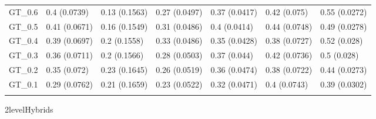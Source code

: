 \documentclass[12pt,titlepage]{article}
\begin{document}
\begin{table}[ht]
\begin{tabular}{rllllll}
  GT\_0.6 & 0.4 (0.0739) & 0.13 (0.1563) & 0.27 (0.0497) & 0.37 (0.0417) & 0.42 (0.075) & 0.55 (0.0272) \\ 
  GT\_0.5 & 0.41 (0.0671) & 0.16 (0.1549) & 0.31 (0.0486) & 0.4 (0.0414) & 0.44 (0.0748) & 0.49 (0.0278) \\ 
  GT\_0.4 & 0.39 (0.0697) & 0.2 (0.1558) & 0.33 (0.0486) & 0.35 (0.0428) & 0.38 (0.0727) & 0.52 (0.028) \\ 
  GT\_0.3 & 0.36 (0.0711) & 0.2 (0.1566) & 0.28 (0.0503) & 0.37 (0.044) & 0.42 (0.0736) & 0.5 (0.028) \\ 
  GT\_0.2 & 0.35 (0.072) & 0.23 (0.1645) & 0.26 (0.0519) & 0.36 (0.0474) & 0.38 (0.0722) & 0.44 (0.0273) \\ 
  GT\_0.1 & 0.29 (0.0762) & 0.21 (0.1659) & 0.23 (0.0522) & 0.32 (0.0471) & 0.4 (0.0743) & 0.39 (0.0302) \\ 
   \bottomrule
\multicolumn{6}{l}{}\\
\end{tabular}
\end{table}




\Genetics2level{Hybrids}
\end{document}

